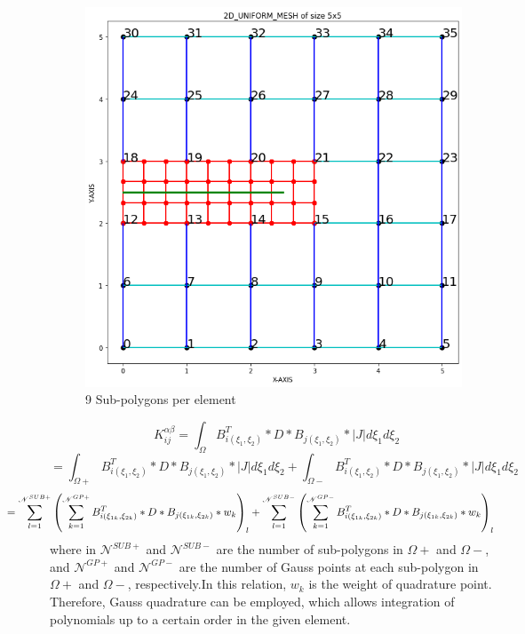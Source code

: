 \documentclass[fleqn, 12.5pt,a4paper]{report}
\begin{document}
\begin{figure}[H]
    \centering
    \includegraphics[scale =0.5]{Subdivision.png}
    \caption{9 Sub-polygons per element}
    \label{fig:9}
\end{figure}

$$\enspace K_{ij}^{\alpha\beta} = \int_{\Omega} B_{i(\xi_1,\xi_2)}^T*D*B_{j(\xi_1,\xi_2)}*| J | d\xi_1d\xi_2$$\vspace{0.1cm}
$$ = \int_{\Omega+} B_{i(\xi_1,\xi_2)}^T*D*B_{j(\xi_1,\xi_2)}*| J | d\xi_1d\xi_2 + \int_{\Omega-} B_{i(\xi_1,\xi_2)}^T*D*B_{j(\xi_1,\xi_2)}*| J | d\xi_1d\xi_2 $$\vspace{0.1cm}
\begin{align}\label{eq:57}
\hspace{-1.5cm}= \sum_{l=1}^{\mathscr{N}^{SUB+}} \left(\sum_{k=1}^{\mathscr{N}^{GP+}} B_{i(\xi_{1k},\xi_{2k})}^T*D*B_{j(\xi_{1k},\xi_{2k})}*w_k \right)_l  + \sum_{l=1}^{\mathscr{N}^{SUB-}} \left(\sum_{k=1}^{\mathscr{N}^{GP-}} B_{i(\xi_{1k},\xi_{2k})}^T*D*B_{j(\xi_{1k},\xi_{2k})}* w_k \right)_l
\end{align}
where in ${\mathscr{N}^{SUB+}}$ and ${\mathscr{N}^{SUB-}}$ are the number of sub-polygons in $\Omega+$ and $\Omega-$, and ${\mathscr{N}^{GP+}}$ and ${\mathscr{N}^{GP-}}$ are the number of Gauss points at each sub-polygon in $\Omega+$ and $\Omega-$, respectively.In this relation, $w_k$ is the weight of quadrature point. Therefore, Gauss quadrature can be employed, which allows integration of polynomials up to a certain order in the given element. 
\end{document}
